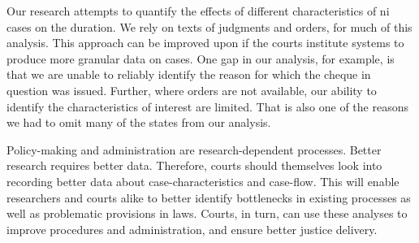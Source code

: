 Our research attempts to quantify the effects of different characteristics of \gls{ni} cases on the duration. We rely on texts of judgments and orders, for much of this analysis. This approach can be improved upon if the courts institute systems to produce more granular data on cases. One gap in our analysis, for example, is that we are unable to reliably identify the reason for which the cheque in question was issued. Further, where orders are not available, our ability to identify the characteristics of interest are limited. That is also one of the reasons we had to omit many of the states from our analysis.

Policy-making and administration are research-dependent processes. Better research requires better data. Therefore, courts should themselves look into recording better data about case-characteristics and case-flow. This will enable researchers and courts alike to better identify bottlenecks in existing processes as well as problematic provisions in laws. Courts, in turn, can use these analyses to improve procedures and administration, and ensure better justice delivery.


